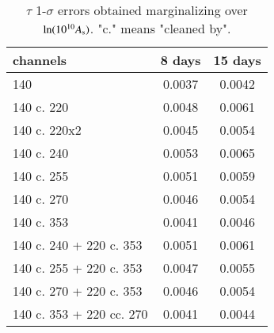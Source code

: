 %


\begin{table}[htp]
\begin{center}
\begin{tabular}{l|c|c}
channels & 8 days & 15 days \\
\hline
140 & 0.0037 & 0.0042\\
140 c. 220 & 0.0048 & 0.0061\\
140 c. 220x2 & 0.0045 & 0.0054\\
140 c. 240 & 0.0053 & 0.0065\\
140 c. 255 & 0.0051 & 0.0059\\
140 c. 270 & 0.0046 & 0.0054\\
140 c. 353 & 0.0041 & 0.0046\\
140 c. 240 + 220 c. 353  & 0.0051 & 0.0061\\
140 c. 255 + 220 c. 353  & 0.0047 & 0.0055\\
140 c. 270 + 220 c. 353  & 0.0046 & 0.0054\\
140 c. 353 + 220 cc. 270  & 0.0041 & 0.0044\\
\end{tabular}
\end{center}
\caption{$\tau$ 1-$\sigma$ errors obtained marginalizing over $\ln(10^{10}A_{\rm s})$. "c." means "cleaned by".
}
\label{tab:tauerrors}
\end{table}%


